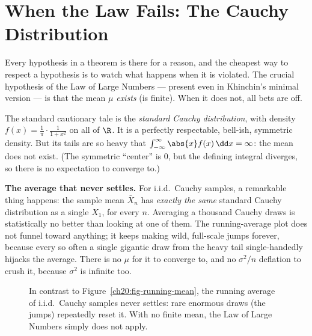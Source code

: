 \section{When the Law Fails: The Cauchy Distribution}
\label{ch20:cauchy}

Every hypothesis in a theorem is there for a reason, and the cheapest way to respect a hypothesis is to watch what happens when it is violated. The crucial hypothesis of the Law of Large Numbers --- present even in Khinchin's minimal version --- is that the mean $\mu$ \emph{exists} (is finite). When it does not, all bets are off.

The standard cautionary tale is the \emph{standard Cauchy distribution}, with density $f(x) = \tfrac1\pi \cdot \tfrac{1}{1+x^2}$ on all of $\R$. It is a perfectly respectable, bell-ish, symmetric density. But its tails are so heavy that $\int_{-\infty}^{\infty} \abs{x} f(x)\,\dd x = \infty$: the mean does not exist. (The symmetric ``center'' is $0$, but the defining integral diverges, so there is no expectation to converge to.)

\begin{paradoxbox}
\textbf{The average that never settles.} For i.i.d.\ Cauchy samples, a remarkable thing happens: the sample mean $\bar X_n$ has \emph{exactly the same} standard Cauchy distribution as a single $X_1$, for every $n$. Averaging a thousand Cauchy draws is statistically no better than looking at one of them. The running-average plot does not funnel toward anything; it keeps making wild, full-scale jumps forever, because every so often a single gigantic draw from the heavy tail single-handedly hijacks the average. There is no $\mu$ for it to converge to, and no $\sigma^2/n$ deflation to crush it, because $\sigma^2$ is infinite too.
\end{paradoxbox}

\begin{figure}[H]
\centering
{}
\caption{In contrast to Figure~\ref{ch20:fig-running-mean}, the running average of i.i.d.\ Cauchy samples never settles: rare enormous draws (the jumps) repeatedly reset it. With no finite mean, the Law of Large Numbers simply does not apply.}
\label{ch20:fig-cauchy}
\end{figure}

